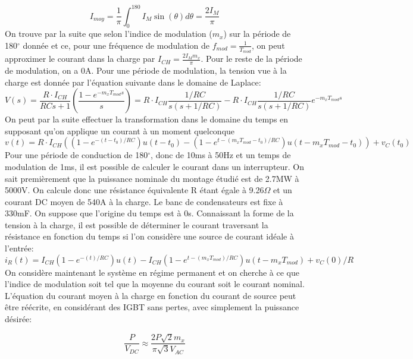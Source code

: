 \begin{equation}
I_{moy} = \frac{1}{\pi}\int_{0}^{180} I_M \sin(\theta)d\theta = \frac{2I_M}{\pi}
\end{equation}
On trouve par la suite que selon l'indice de modulation ($m_x$) sur la période de 180$^\circ$ donnée et ce, pour une fréquence de modulation de $f_{mod} = \frac{1}{T_{mod}}$, on peut approximer le courant dans la charge par $I_{CH} = \frac{2I_M m_x}{\pi}$. Pour le reste de la période de modulation, on a 0A. Pour une période de modulation, la tension vue à la charge est donnée par l'équation suivante dans le domaine de Laplace:
\begin{equation}
V(s) = \frac{R\cdot I_{CH}}{RCs + 1} \left(\frac{1 - e^{-m_xT_{mod}s}}{s}\right) = R\cdot I_{CH}\frac{1/RC}{s(s + 1/RC)} - R\cdot I_{CH}\frac{1/RC}{s(s + 1/RC)}e^{-m_xT_{mod}s}
\end{equation}
On peut par la suite effectuer la transformation dans le domaine du temps en supposant qu'on applique un courant à un moment quelconque
\begin{equation}
v(t) = R\cdot I_{CH}\left((1-e^{-(t-t_0)/RC})u(t-t_0) - (1-e^{t-(m_xT_{mod}-t_0)/RC})u(t-m_xT_{mod}-t_0)\right) + v_C(t_0)
\end{equation}
Pour une période de conduction de 180$^\circ$, donc de 10ms à 50Hz et un temps de modulation de 1ms, il est possible de calculer le courant dans un interrupteur. On sait premièrement que la puissance nominale du montage étudié est de 2.7MW à 5000V. On calcule donc une résistance équivalente R étant égale à 9.26$\Omega$ et un courant DC moyen de 540A à la charge. Le banc de condensateurs est fixe à 330mF. On suppose que l'origine du temps est à 0s. Connaissant la forme de la tension à la charge, il est possible de déterminer le courant traversant la résistance en fonction du temps si l'on considère une source de courant idéale à l'entrée:
\begin{equation}
i_R(t) = I_{CH}(1-e^{-(t)/RC})u(t) - I_{CH}(1-e^{t-(m_xT_{mod})/RC})u(t-m_xT_{mod}) + v_C(0)/R
\end{equation}
On considère maintenant le système en régime permanent et on cherche  à ce que l'indice de modulation soit tel que la moyenne du courant soit le courant nominal. L'équation du courant moyen à la charge en fonction du courant de source peut être réécrite, en considérant des IGBT sans pertes, avec simplement la puissance désirée:

\begin{equation}
\frac{P}{V_{DC}} \approx \frac{2 P \sqrt{2} m_x}{\pi \sqrt{3}V_{AC}}
\end{equation} 

